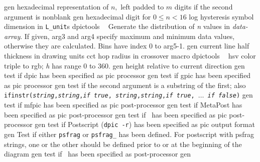 %
  {gen}%
  {hexadecimal representation of $n,$ left padded to $m$ digits if the second
   argument is nonblank}%
%
  {gen}%
  {hexadecimal digit for $0 \leq n < 16$}%
%
  {log}%
  {hysteresis symbol dimension in {\tt L\_unit}s}%
%
  {dpictools}%
  {$\;\;$ Generate the distribution of {\sl n} values in {\sl data-array}.
    If given, arg3 and arg4 specify maximum and minimum data values,
    otherwise they are calculated. Bins have index 0 to arg5-1.}%
%
  {gen}%
  {current line half thickness in drawing units}%
%
  {cct}%
  {hop radius in crossover macro}%
%
  {dpictools}%
  {$\;\;$ hsv color triple to rgb; {\sl h} has range 0 to 360.}%
%
  {gen}%
  {height relative to current direction}%
%
%
%
  {gen}%
  {test if dpic has been specified as pic processor}%
%
  {gen}%
  {test if gpic has been specified as pic processor}%
%
  {gen}%
  {test if the second argument is a substring of the first; also
  {\tt ifinstr({\sl string},{\sl string},{\sl if true},{\sl
  string},{\sl string},{\sl if true}, $\ldots$ {\sl if false})}%
    }%
%
  {gen}%
  {test if mfpic has been specified as pic post-processor}%
%
  {gen}%
  {test if MetaPost has been specified as pic post-processor}%
%
  {gen}%
  {test if \TPGF~has been specified as pic post-processor}%
%
  {gen}%
  {test if Postscript ({\tt dpic -r}) has been specified as pic output format}%
%
  {gen}%
  {Test if either {\tt psfrag} or {\tt psfrag\_} has been defined. For
   postscript with psfrag strings, one or the other should be defined
   prior to or at the beginning of the diagram}%
%
  {gen}%
  {test if \PSTricks~has been specified as post-processor}%
%
  {gen}%
